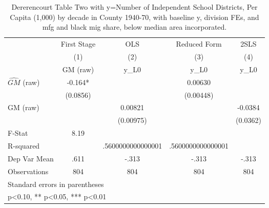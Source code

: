 \begin{table}[htbp]\centering
\def\sym#1{\ifmmode^{#1}\else\(^{#1}\)\fi}
\caption{Dererencourt Table Two with y=Number of Independent School Districts, Per Capita (1,000) by decade in County 1940-70, with baseline y, division FEs, and mfg and black mig share, below median area incorporated.}
\begin{tabular}{l*{4}{c}}
\toprule
                    & First Stage   &         OLS   &Reduced Form   &        2SLS   \\
                    &\multicolumn{1}{c}{(1)}&\multicolumn{1}{c}{(2)}&\multicolumn{1}{c}{(3)}&\multicolumn{1}{c}{(4)}\\
                    &\multicolumn{1}{c}{GM  (raw)}&\multicolumn{1}{c}{y\_L0}&\multicolumn{1}{c}{y\_L0}&\multicolumn{1}{c}{y\_L0}\\
\midrule
$\hat{GM}$ (raw)    &      -0.164*  &               &     0.00630   &               \\
                    &    (0.0856)   &               &   (0.00448)   &               \\
\addlinespace
GM  (raw)           &               &     0.00821   &               &     -0.0384   \\
                    &               &   (0.00975)   &               &    (0.0362)   \\
\midrule
F-Stat              &        8.19   &               &               &               \\
R-squared           &               &.5600000000000001   &.5600000000000001   &               \\
Dep Var Mean        &        .611   &       -.313   &       -.313   &       -.313   \\
Observations        &         804   &         804   &         804   &         804   \\
\bottomrule
\multicolumn{5}{l}{\footnotesize Standard errors in parentheses}\\
\multicolumn{5}{l}{\footnotesize * p<0.10, ** p<0.05, *** p<0.01}\\
\end{tabular}
\end{table}

